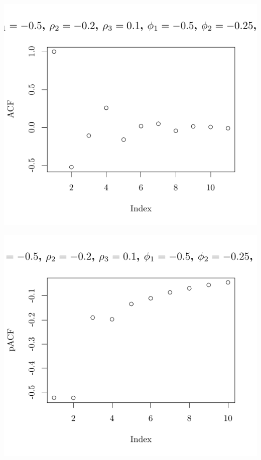 \documentclass[10pt]{paper}\usepackage[]{graphicx}\usepackage[]{color}
\makeatletter
\def\maxwidth{ %
  \ifdim\Gin@nat@width>\linewidth
    \linewidth
  \else
    \Gin@nat@width
  \fi
}
\newenvironment{knitrout}{}{} %
\makeatother
\begin{document}
\begin{knitrout}
{\centering \includegraphics[width=\maxwidth]{figure/graphics-plotter-153} 

}




{\centering \includegraphics[width=\maxwidth]{figure/graphics-plotter-154} 

}





\end{knitrout}
\end{document}
